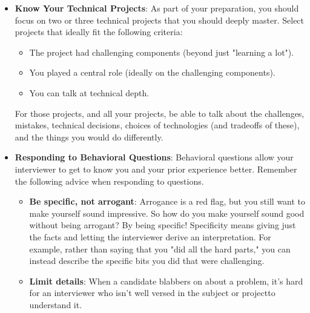 \documentclass{report}
\begin{document}
\begin{itemize}
\begin{enumerate}
\begin{enumerate}
                        \item "I'm not familiar with technology X, but it sounds like a very interesting solution. Could you tell me a bit more about how it works?"
                    \end{enumerate}
                    As part of your preparation, you should focus on two or three technical projects that you should deeply master. Select projects that ideally fit the following criteria:
            \end{enumerate}
        \item \textbf{Know Your Technical Projects}: As part of your preparation, you should focus on two or three technical projects that you should deeply master. Select projects that ideally fit the following criteria:
            \begin{itemize}
                \item The project had challenging components (beyond just "learning a lot").
                \item You played a central role (ideally on the challenging components).
                \item You can talk at technical depth.
            \end{itemize}
            For those projects, and all your projects, be able to talk about the challenges, mistakes, technical decisions, choices of technologies (and tradeoffs of these), and the things you would do differently.
        \item \textbf{Responding to Behavioral Questions}: Behavioral questions allow your interviewer to get to know you and your prior experience better. Remember the following advice when responding to questions. 
            \begin{itemize}
                \item \textbf{Be specific, not arrogant}: Arrogance is a red flag, but you still want to make yourself sound impressive. So how do you make yourself sound good without being arrogant? By being specific! 
                    \bigbreak \noindent 
                    Specificity means giving just the facts and letting the interviewer derive an interpretation. For example, rather than saying that you "did all the hard parts," you can instead describe the specific bits you did that were challenging.
                \item \textbf{Limit details}: When a candidate blabbers on about a problem, it's hard for an interviewer who isn't well versed in the subject or projectto understand it. 

\end{itemize}
\end{itemize}
\end{document}
